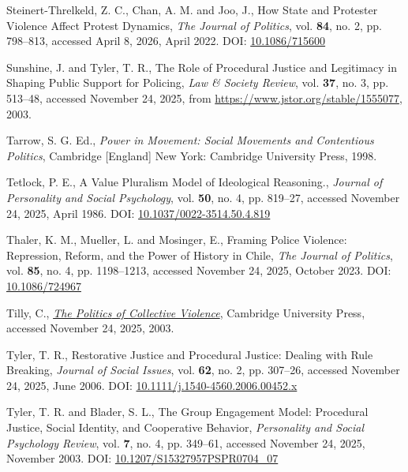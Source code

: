 \documentclass[
  13pt,
]{article}
\newlength{\cslhangindent}
\newenvironment{CSLReferences}[2] %
 {\begin{list}{}{%
  \setlength{\itemindent}{0pt}
  \setlength{\leftmargin}{0pt}
  \setlength{\parsep}{0pt}
  \ifodd #1
   \setlength{\leftmargin}{\cslhangindent}
   \setlength{\itemindent}{-1\cslhangindent}
  \fi
  \setlength{\itemsep}{#2\baselineskip}}}
 {\end{list}}
\begin{document}
\begin{CSLReferences}{1}{0}
Steinert-Threlkeld, Z. C., Chan, A. M. and Joo, J., How {State} and
{Protester Violence Affect Protest Dynamics}, \emph{The Journal of
Politics}, vol. \textbf{84}, no. 2, pp. 798--813, accessed April 8,
2026, April 2022. DOI:
\href{https://doi.org/10.1086/715600}{10.1086/715600}

Sunshine, J. and Tyler, T. R., The {Role} of {Procedural Justice} and
{Legitimacy} in {Shaping Public Support} for {Policing}, \emph{Law \&
Society Review}, vol. \textbf{37}, no. 3, pp. 513--48, accessed November
24, 2025, from \url{https://www.jstor.org/stable/1555077}, 2003.

Tarrow, S. G. Ed., \emph{Power in Movement: Social Movements and
Contentious Politics}, Cambridge {[}England{]} New York: Cambridge
University Press, 1998.

Tetlock, P. E., A Value Pluralism Model of Ideological Reasoning.,
\emph{Journal of Personality and Social Psychology}, vol. \textbf{50},
no. 4, pp. 819--27, accessed November 24, 2025, April 1986. DOI:
\href{https://doi.org/10.1037/0022-3514.50.4.819}{10.1037/0022-3514.50.4.819}

Thaler, K. M., Mueller, L. and Mosinger, E., Framing {Police Violence}:
{Repression}, {Reform}, and the {Power} of {History} in {Chile},
\emph{The Journal of Politics}, vol. \textbf{85}, no. 4, pp. 1198--1213,
accessed November 24, 2025, October 2023. DOI:
\href{https://doi.org/10.1086/724967}{10.1086/724967}

Tilly, C., \emph{\href{https://doi.org/10.1017/CBO9780511819131}{The
{Politics} of {Collective Violence}}}, Cambridge University Press,
accessed November 24, 2025, 2003.

Tyler, T. R., Restorative {Justice} and {Procedural Justice}: {Dealing}
with {Rule Breaking}, \emph{Journal of Social Issues}, vol. \textbf{62},
no. 2, pp. 307--26, accessed November 24, 2025, June 2006. DOI:
\href{https://doi.org/10.1111/j.1540-4560.2006.00452.x}{10.1111/j.1540-4560.2006.00452.x}

Tyler, T. R. and Blader, S. L., The {Group Engagement Model}:
{Procedural Justice}, {Social Identity}, and {Cooperative Behavior},
\emph{Personality and Social Psychology Review}, vol. \textbf{7}, no. 4,
pp. 349--61, accessed November 24, 2025, November 2003. DOI:
\href{https://doi.org/10.1207/S15327957PSPR0704_07}{10.1207/S15327957PSPR0704\_07}


\end{CSLReferences}
\end{document}
